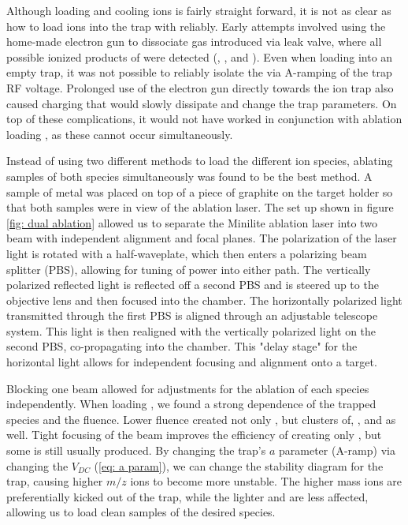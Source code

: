Although loading and cooling  ions is fairly straight forward, it is not as clear as how to load  ions into the trap with  reliably. Early attempts involved using the home-made electron gun to dissociate  gas introduced via leak valve, where all possible ionized products of  were detected (, , and ). Even when loading into an empty trap, it was not possible to reliably isolate the  via A-ramping of the trap RF voltage. Prolonged use of the electron gun directly towards the ion trap also caused charging that would slowly dissipate and change the trap parameters. On top of these complications, it would not have worked in conjunction with ablation loading , as these cannot occur simultaneously.

Instead of using two different methods to load the different ion species, ablating samples of both species simultaneously was found to be the best method. A sample of  metal was placed on top of a piece of graphite on the target holder so that both samples were in view of the ablation laser. The set up shown in figure \ref{fig: dual ablation} allowed us to separate the Minilite ablation laser into two beam with independent alignment and focal planes. The polarization of the laser light is rotated with a half-waveplate, which then enters a polarizing beam splitter (PBS), allowing for tuning of power into either path. The vertically polarized reflected light is reflected off a second PBS and is steered up to the objective lens and then focused into the chamber. The horizontally polarized light transmitted through the first PBS is aligned through an adjustable telescope system. This light is then realigned with the vertically polarized light on the second PBS, co-propagating into the chamber. This "delay stage" for the horizontal light allows for independent focusing and alignment onto a target.

Blocking one beam allowed for adjustments for the ablation of each species independently. When loading , we found a strong dependence of the trapped species and the fluence. Lower fluence created not only , but clusters of, , and  as well. Tight focusing of the beam improves the efficiency of creating only , but some  is still usually produced. By changing the trap's $a$ parameter (A-ramp) via changing the $V_{DC}$ (\ref{eq: a param}), we can change the stability diagram for the trap, causing higher $m/z$ ions to become more unstable. The higher mass  ions are preferentially kicked out of the trap, while the lighter  and  are less affected, allowing us to load clean samples of the desired species.

